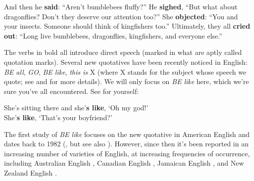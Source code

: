 \begin{exe}
    \ex And then he \textbf{said}: ``Aren't bumblebees fluffy?''
    \ex He \textbf{sighed}, ``But what about dragonflies? Don't they deserve our attention too?''
    \ex She \textbf{objected}: ``You and your insects. Someone should think of kingfishers too.''
    \ex Ultimately, they all \textbf{cried out}: ``Long live bumblebees, dragonflies, kingfishers, and everyone else.''
\end{exe}

\noindent The verbs in bold all introduce direct speech (marked in what are aptly called quotation marks). Several new quotatives have been recently noticed in English: \emph{BE all}, \emph{GO}, \emph{BE like}, \emph{this is} X (where X stands for the subject whose speech we quote; see \citealp{Buchstaller2001,Buchstaller2013} and \citealp{DArcy2010} for more details). We will only focus on \emph{BE like} here, which we're sure you've all encountered. See for yourself:

\begin{exe}
    \ex She's sitting there and she'\textbf{s like}, ‘Oh my god!'\\
    She'\textbf{s like}, ‘That's your boyfriend?'\\\citep[493]{TagliamonteDArcy2004}
\end{exe}

\noindent The first study of \emph{BE like} focuses on the new quotative in American English and dates back to 1982 (\citealp{Butters1982}, but see also \citealp{Buchstaller2006}). However, since then it's been reported in an increasing number of varieties of English, at increasing frequencies of occurrence, including Australian English \citep{Louro2013}, Canadian English \citep{TagliamonteDArcy2004}, Jamaican English \citep{Bogetić2014}, and New Zealand English \citep{DArcy2010}.

